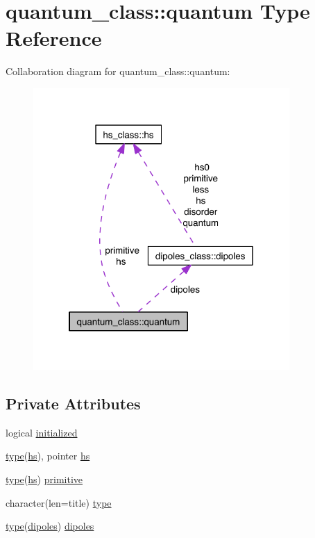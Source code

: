 \hypertarget{structquantum__class_1_1quantum}{}\section{quantum\+\_\+class\+:\+:quantum Type Reference}
\label{structquantum__class_1_1quantum}


Collaboration diagram for quantum\+\_\+class\+:\+:quantum\+:\nopagebreak
\begin{figure}[H]
\begin{center}
\leavevmode
\includegraphics[width=277pt]{structquantum__class_1_1quantum__coll__graph}
\end{center}
\end{figure}
\subsection*{Private Attributes}
\begin{DoxyCompactItemize}
\item 
logical \hyperlink{structquantum__class_1_1quantum_a2900a58a734e38e761bd1d8c60b4b81f}{initialized}
\item 
\hyperlink{structquantum__class_1_1quantum_aa222a9bd02a7dd3f8b37cdbcd33a6d74}{type}(\hyperlink{strucths__class_1_1hs}{hs}), pointer \hyperlink{structquantum__class_1_1quantum_a3fc38910e311bd6d449279fb2ac7288a}{hs}
\item 
\hyperlink{structquantum__class_1_1quantum_aa222a9bd02a7dd3f8b37cdbcd33a6d74}{type}(\hyperlink{strucths__class_1_1hs}{hs}) \hyperlink{structquantum__class_1_1quantum_a285ebdf853c486f65ce55d6f45e65720}{primitive}
\item 
character(len=title) \hyperlink{structquantum__class_1_1quantum_aa222a9bd02a7dd3f8b37cdbcd33a6d74}{type}
\item 
\hyperlink{structquantum__class_1_1quantum_aa222a9bd02a7dd3f8b37cdbcd33a6d74}{type}(\hyperlink{structdipoles__class_1_1dipoles}{dipoles}) \hyperlink{structquantum__class_1_1quantum_a987a3ad91de3703c7468ce14d9ba872c}{dipoles}
\end{DoxyCompactItemize}


